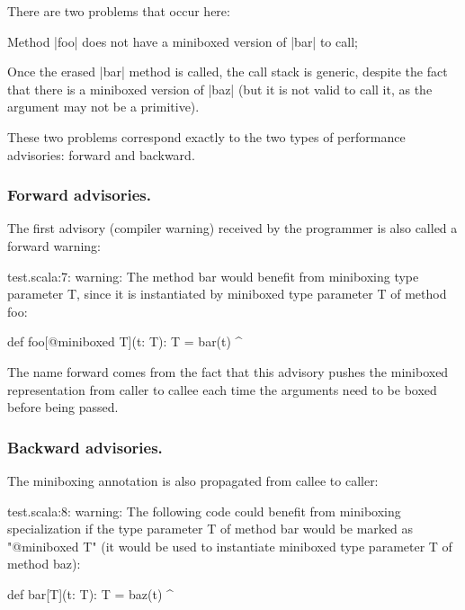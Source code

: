 There are two problems that occur here:

\begin{compactitem}
 \item Method |foo| does not have a miniboxed version of |bar| to call;
 \item Once the erased |bar| method is called, the call stack is generic, despite the fact that there is a miniboxed version of |baz| (but it is not valid to call it, as the argument may not be a primitive).
\end{compactitem}

These two problems correspond exactly to the two types of performance advisories: forward and backward.

\subsubsection{Forward advisories.} The first advisory (compiler warning) received by the programmer is also called a forward warning:

\begin{lstlisting-nobreak-nolang}
test.scala:7: warning: The method bar would benefit from miniboxing type parameter T, since it is instantiated by miniboxed type parameter T of method foo:

       def foo[@miniboxed T](t: T): T = bar(t)
                                        ^
\end{lstlisting-nobreak-nolang}

The name forward comes from the fact that this advisory pushes the miniboxed representation from caller to callee each time the arguments need to be boxed before being passed.

\subsubsection{Backward advisories.} The miniboxing annotation is also propagated from callee to caller:

\begin{lstlisting-nobreak-nolang}
test.scala:8: warning: The following code could benefit from miniboxing specialization if the type parameter T of method bar would be marked as "@miniboxed T" (it would be used to instantiate miniboxed type parameter T of method baz):

        def bar[T](t: T): T = baz(t)
                              ^
\end{lstlisting-nobreak-nolang}

